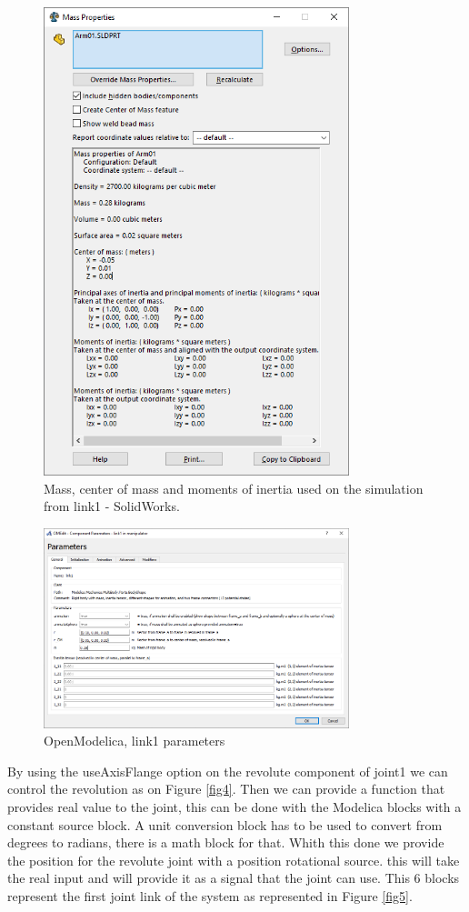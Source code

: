 \documentclass[transmag]{IEEEtran}
\begin{document}
\begin{figure}
\centerline{\includegraphics[width=3.5in]{./images/MassProperties}}
\caption{Mass, center of mass and moments of inertia used on the simulation from link1 - SolidWorks.\label{fig2}}
\end{figure}


\begin{figure}
\centerline{\includegraphics[width=3.5in]{./images/Link1Parameters}}
\caption{OpenModelica, link1 parameters\label{fig3}}
\end{figure}
 


By using the useAxisFlange option on the revolute component of joint1 we can control the revolution as on Figure \ref{fig4}. Then we can provide a function that provides real value to the joint, this can be done with the Modelica blocks with a constant source block. A unit conversion block has to be used to convert from degrees to radians, there is a math block for that. Whith this done we provide the position for the revolute joint with a position rotational source. this will take the real input and will provide it as a signal that the joint can use. This 6 blocks represent the first joint link of the system as represented in Figure \ref{fig5}.
\end{document}

